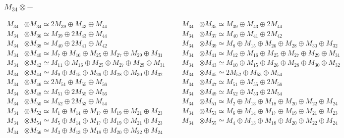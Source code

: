 \subsubsection{$ M_{34}\otimes -$}
\begin{align*}
M_{34} &\otimes M_{34} \simeq 2M_{39} \oplus M_{43} \oplus M_{44} &&& M_{34} &\otimes M_{35} \simeq M_{39} \oplus M_{43} \oplus 2M_{44}\\
M_{34} &\otimes M_{36} \simeq M_{39} \oplus 2M_{43} \oplus M_{44} &&& M_{34} &\otimes M_{37} \simeq M_{40} \oplus M_{41} \oplus 2M_{42}\\
M_{34} &\otimes M_{38} \simeq M_{40} \oplus 2M_{41} \oplus M_{42} &&& M_{34} &\otimes M_{39} \simeq M_{8} \oplus M_{15} \oplus M_{26} \oplus M_{28} \oplus M_{30} \oplus M_{32}\\
M_{34} &\otimes M_{40} \simeq M_{7} \oplus M_{16} \oplus M_{25} \oplus M_{27} \oplus M_{29} \oplus M_{31} &&& M_{34} &\otimes M_{41} \simeq M_{12} \oplus M_{16} \oplus M_{25} \oplus M_{27} \oplus M_{29} \oplus M_{31}\\
M_{34} &\otimes M_{42} \simeq M_{11} \oplus M_{16} \oplus M_{25} \oplus M_{27} \oplus M_{29} \oplus M_{31} &&& M_{34} &\otimes M_{43} \simeq M_{10} \oplus M_{15} \oplus M_{26} \oplus M_{28} \oplus M_{30} \oplus M_{32}\\
M_{34} &\otimes M_{44} \simeq M_{9} \oplus M_{15} \oplus M_{26} \oplus M_{28} \oplus M_{30} \oplus M_{32} &&& M_{34} &\otimes M_{45} \simeq 2M_{52} \oplus M_{53} \oplus M_{54}\\
M_{34} &\otimes M_{46} \simeq 2M_{51} \oplus M_{55} \oplus M_{56} &&& M_{34} &\otimes M_{47} \simeq M_{51} \oplus M_{55} \oplus 2M_{56}\\
M_{34} &\otimes M_{48} \simeq M_{51} \oplus 2M_{55} \oplus M_{56} &&& M_{34} &\otimes M_{49} \simeq M_{52} \oplus M_{53} \oplus 2M_{54}\\
M_{34} &\otimes M_{50} \simeq M_{52} \oplus 2M_{53} \oplus M_{54} &&& M_{34} &\otimes M_{51} \simeq M_{2} \oplus M_{13} \oplus M_{18} \oplus M_{20} \oplus M_{22} \oplus M_{24}\\
M_{34} &\otimes M_{52} \simeq M_{1} \oplus M_{14} \oplus M_{17} \oplus M_{19} \oplus M_{21} \oplus M_{23} &&& M_{34} &\otimes M_{53} \simeq M_{6} \oplus M_{14} \oplus M_{17} \oplus M_{19} \oplus M_{21} \oplus M_{23}\\
M_{34} &\otimes M_{54} \simeq M_{5} \oplus M_{14} \oplus M_{17} \oplus M_{19} \oplus M_{21} \oplus M_{23} &&& M_{34} &\otimes M_{55} \simeq M_{4} \oplus M_{13} \oplus M_{18} \oplus M_{20} \oplus M_{22} \oplus M_{24}\\
M_{34} &\otimes M_{56} \simeq M_{3} \oplus M_{13} \oplus M_{18} \oplus M_{20} \oplus M_{22} \oplus M_{24}
\end{align*}

